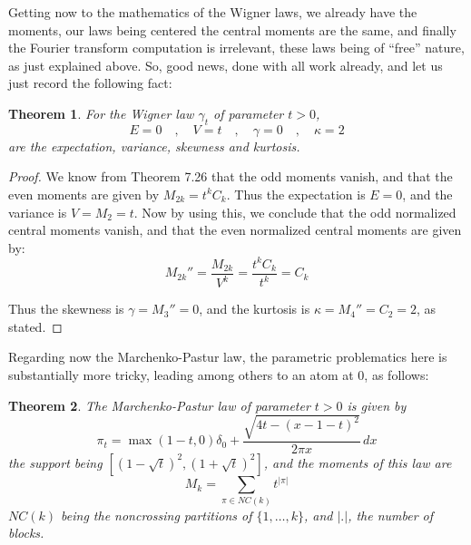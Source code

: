 \documentclass[12pt]{amsbook}
\newtheorem{theorem}{Theorem}[chapter]
\begin{document}
Getting now to the mathematics of the Wigner laws, we already have the moments, our laws being centered the central moments are the same, and finally the Fourier transform computation is irrelevant, these laws being of ``free'' nature, as just explained above. So, good news, done with all work already, and let us just record the following fact:

\begin{theorem}
For the Wigner law $\gamma_t$ of parameter $t>0$,
$$E=0\quad,\quad V=t\quad,\quad \gamma=0\quad,\quad \kappa=2$$
are the expectation, variance, skewness and kurtosis.
\end{theorem}

\begin{proof}
We know from Theorem 7.26 that the odd moments vanish, and that the even moments are given by $M_{2k}=t^kC_k$. Thus the expectation is $E=0$, and the variance is $V=M_2=t$. Now by using this, we conclude that the odd normalized central moments vanish, and that the even normalized central moments are given by:
$$M_{2k}''=\frac{M_{2k}}{V^k}=\frac{t^kC_k}{t^k}=C_k$$

Thus the skewness is $\gamma=M_3''=0$, and the kurtosis is $\kappa=M_4''=C_2=2$, as stated.
\end{proof}

Regarding now the Marchenko-Pastur law, the parametric problematics here is substantially more tricky, leading among others to an atom at $0$, as follows:

\begin{theorem}
The Marchenko-Pastur law of parameter $t>0$ is given by
$$\pi_t=\max(1-t,0)\delta_0+\frac{\sqrt{4t-(x-1-t)^2}}{2\pi x}\,dx$$
the support being $[(1-\sqrt{t})^2,(1+\sqrt{t})^2]$, 
and the moments of this law are
$$M_k=\sum_{\pi\in NC(k)}t^{|\pi|}$$
$NC(k)$ being the noncrossing partitions of $\{1,\ldots,k\}$, and $|.|$, the number of blocks.
\end{theorem}
\end{document}

